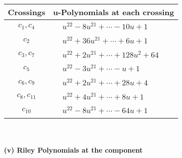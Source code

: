 \documentclass[1p]{elsarticle_modified}
\theoremstyle{definition}
\begin{document}
\begin{tabular}{m{50pt}|m{274pt}}
Crossings & \hspace{64pt}u-Polynomials at each crossing \\
\hline $$\begin{aligned}c_{1},c_{4}\end{aligned}$$&$\begin{aligned}
&u^{22}-8 u^{21}+\cdots-10 u+1
\end{aligned}$\\
\hline $$\begin{aligned}c_{2}\end{aligned}$$&$\begin{aligned}
&u^{22}+36 u^{21}+\cdots+6 u+1
\end{aligned}$\\
\hline $$\begin{aligned}c_{3},c_{7}\end{aligned}$$&$\begin{aligned}
&u^{22}+2 u^{21}+\cdots+128 u^2+64
\end{aligned}$\\
\hline $$\begin{aligned}c_{5}\end{aligned}$$&$\begin{aligned}
&u^{22}-3 u^{21}+\cdots- u+1
\end{aligned}$\\
\hline $$\begin{aligned}c_{6},c_{9}\end{aligned}$$&$\begin{aligned}
&u^{22}+2 u^{21}+\cdots+28 u+4
\end{aligned}$\\
\hline $$\begin{aligned}c_{8},c_{11}\end{aligned}$$&$\begin{aligned}
&u^{22}+4 u^{21}+\cdots+8 u+1
\end{aligned}$\\
\hline $$\begin{aligned}c_{10}\end{aligned}$$&$\begin{aligned}
&u^{22}-8 u^{21}+\cdots-64 u+1
\end{aligned}$\\
\hline
\end{tabular}\\~\\
\newpage\renewcommand{\arraystretch}{1}
\flushleft \textbf{(v) Riley Polynomials at the component}\newline \\
\end{document}
